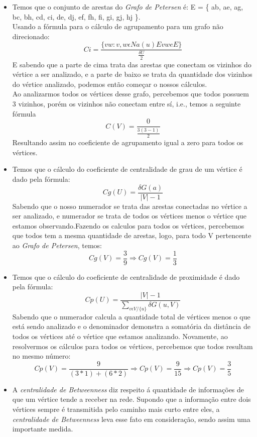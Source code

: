 \documentclass[11pt,reqno]{amsart}
\begin{document}
\begin{enumerate}
		\begin{itemize}
			\item Temos que o conjunto de arestas do \textit{Grafo de Petersen} é: E = \{ ab, ae, ag, bc, bh, cd, ci, de, dj, ef, fh, fi, gi, gj, hj \}. \\ Usando a fórmula para o cálculo de agrupamento para um grafo não direcionado: \[ C\textit{i} = \frac{\{vw: v,w\epsilon  Na(u) E vw\textit{e} E\}}{\frac{\delta U}{2}}\] E sabendo que a parte de cima trata das arestas que conectam os vizinhos do vértice a ser analizado, e a parte de baixo se trata da quantidade dos vizinhos do vértice analizado, podemos então começar o nossos cálculos.\\ Ao analizarmos todos os vértices desse grafo, percebemos que todos possuem 3 vizinhos, porém os vizinhos não conectam entre sí, i.e., temos a seguinte fórmula \[C(V) = \frac{0}{\frac{3(3-1)}{2}}\] Resultando assim no coeficiente de agrupamento igual a zero para todos os vértices.
			\vspace{5.0cm}
			\item Temos que o cálculo do coeficiente de centralidade de grau de um vértice é dado pela fórmula: \[C\textit{g}(U) = \frac{\delta G(a)}{|V|-1}\] Sabendo que o nosso numerador se trata das arestas conectadas no vértice a ser analizado, e numerador se trata de todos os vértices menos o vértice que estamos observando.Fazendo os calculos para todos os vértices, percebemos que todos tem a mesma quantidade de arestas, logo, para todo V pertencente ao \textit{Grafo de Petersen}, temos: \[C\textit{g}(V) = \frac{3}{9} \Rightarrow C\textit{g}(V) = \frac{1}{3}\] 
			\item Temos que o cálculo do coeficiente de centralidade de proximidade é dado pela fórmula: \[C\textit{p}(U) = \frac{|V|-1}{\sum\limits_{v \epsilon V /\{u\}}\delta G(u,V)}\] Sabendo que o numerador calcula a quantidade total de vértices menos o que está sendo analizado e o denominador demonstra a somatória da distância de todos os vértices até o vértice que estamos analizando. Novamente, ao resolvermos os cálculos para todos os vértices, percebemos que todos resultam no mesmo número: \[C\textit{p}(V) = \frac{9}{(3*1)+(6*2)} \Rightarrow C\textit{p}(V) = \frac{9}{15} \Rightarrow C\textit{p}(V) = \frac{3}{5}\] 
			\item A \textit{centralidade de Betweenness} diz respeito á quantidade de informações de que um vértice tende a receber na rede. Supondo que a informação entre dois vértices sempre é transmitida pelo caminho mais curto entre eles, a \textit{centralidade de Betweenness} leva esse fato em consideração, sendo assim uma importante medida.
		\end{itemize}
		\vspace{0.4cm}


\end{enumerate}
\end{document}
